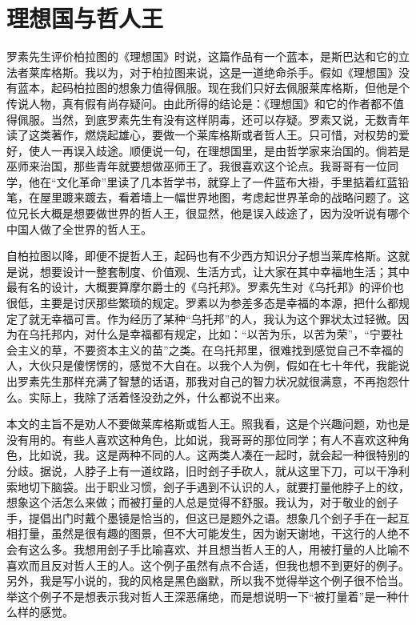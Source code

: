 \chapter{理想国与哲人王}

罗素先生评价柏拉图的《理想国》时说，这篇作品有一个蓝本，是斯巴达和它的立法者莱库格斯。我以为，对于柏拉图来说，这是一道绝命杀手。假如《理想国》没有蓝本，起码柏拉图的想象力值得佩服。现在我们只好去佩服莱库格斯，但他是个传说人物，真有假有尚存疑问。由此所得的结论是：《理想国》和它的作者都不值得佩服。当然，到底罗素先生有没有这样阴毒，还可以存疑。罗素又说，无数青年读了这类著作，燃烧起雄心，要做一个莱库格斯或者哲人王。只可惜，对权势的爱好，使人一再误入歧途。顺便说一句，在理想国里，是由哲学家来治国的。倘若是巫师来治国，那些青年就要想做巫师王了。我很喜欢这个论点。我哥哥有一位同学，他在“文化革命”里读了几本哲学书，就穿上了一件蓝布大褂，手里掂着红蓝铅笔，在屋里踱来踱去，看着墙上一幅世界地图，考虑起世界革命的战略问题了。这位兄长大概是想要做世界的哲人王，很显然，他是误入歧途了，因为没听说有哪个中国人做了全世界的哲人王。 

自柏拉图以降，即便不提哲人王，起码也有不少西方知识分子想当莱库格斯。这就是说，想要设计一整套制度、价值观、生活方式，让大家在其中幸福地生活；其中最有名的设计，大概要算摩尔爵士的《乌托邦》。罗素先生对《乌托邦》的评价也很低，主要是讨厌那些繁琐的规定。罗素以为参差多态是幸福的本源，把什么都规定了就无幸福可言。作为经历了某种“乌托邦”的人，我认为这个罪状太过轻微。因为在乌托邦内，对什么是幸福都有规定，比如：“以苦为乐，以苦为荣”，“宁要社会主义的草，不要资本主义的苗”之类。在乌托邦里，很难找到感觉自己不幸福的人，大伙只是傻愣愣的，感觉不大自在。以我个人为例，假如在七十年代，我能说出罗素先生那样充满了智慧的话语，那我对自己的智力状况就很满意，不再抱怨什么。实际上，我除了活着怪没劲之外，什么都说不出来。 

本文的主旨不是劝人不要做莱库格斯或哲人王。照我看，这是个兴趣问题，劝也是没有用的。有些人喜欢这种角色，比如说，我哥哥的那位同学；有人不喜欢这种角色，比如说，我。这是两种不同的人。这两类人凑在一起时，就会起一种很特别的分歧。据说，人脖子上有一道纹路，旧时刽子手砍人，就从这里下刀，可以干净利索地切下脑袋。出于职业习惯，刽子手遇到不认识的人，就要打量他脖子上的纹，想象这个活怎么来做；而被打量的人总是觉得不舒服。我认为，对于敬业的刽子手，提倡出门时戴个墨镜是恰当的，但这已是题外之语。想象几个刽子手在一起互相打量，虽然是很有趣的图景，但不大可能发生，因为谢天谢地，干这行的人绝不会有这么多。我想用刽子手比喻喜欢、并且想当哲人王的人，用被打量的人比喻不喜欢而且反对哲人王的人。这个例子虽然有点不合适，但我也想不到更好的例子。另外，我是写小说的，我的风格是黑色幽默，所以我不觉得举这个例子很不恰当。举这个例子不是想表示我对哲人王深恶痛绝，而是想说明一下“被打量着”是一种什么样的感觉。 

